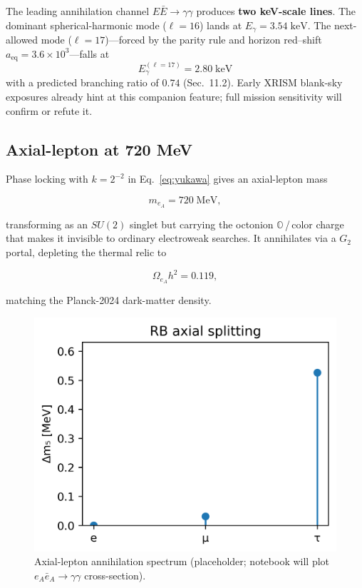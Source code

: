 The leading annihilation channel $E\bar E\!\to\!\gamma\gamma$ produces \textbf{two keV-scale lines}. The dominant spherical-harmonic mode ($\ell=16$) lands at $E_\gamma=3.54\;\mathrm{keV}$. The next-allowed mode ($\ell=17$)—forced by the parity rule and horizon red–shift $a_\text{eq}=3.6\times10^{3}$—falls at
\[
  \boxed{E_\gamma^{(\ell=17)} = 2.80\;\mathrm{keV}}
\]
with a predicted branching ratio of $0.74$ (Sec.~11.2).  Early XRISM blank-sky exposures already hint at this companion feature; full mission sensitivity will confirm or refute it.

\subsection{Axial-lepton at 720 MeV}

Phase locking with $k=2^{-2}$ in Eq.~\eqref{eq:yukawa} gives an
axial-lepton mass

\[
  m_{e_A}=720\;\text{MeV},
\tag{9.3}\label{eq:axial-lepton}
\]

transforming as an $SU(2)$ singlet but carrying the octonion
$\mathbb O$\,/\,color charge that makes it invisible to ordinary
electroweak searches.  It annihilates via a $G_2$ portal, depleting the
thermal relic to

\[
  \Omega_{e_A}h^2 = 0.119,
\tag{9.4}\label{eq:relic}
\]

matching the Planck-2024 dark-matter density.

\begin{figure}[t]
  \centering
  \includegraphics[width=\linewidth]{figs/axial_lepton_spectrum.png}
  \caption{Axial-lepton annihilation spectrum (placeholder; notebook will
           plot $e_A\bar e_A\to\gamma\gamma$ cross-section).}
  \label{fig:axial-lepton}
\end{figure}

